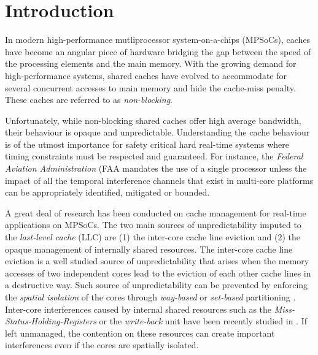 \section{Introduction}
    In modern high-performance mutliprocessor system-on-a-chips (MPSoCs), caches have become an angular piece of hardware bridging the gap between the speed of the processing elements and the main memory.
    With the growing demand for high-performance systems, shared caches have evolved to accommodate for several concurrent accesses to main memory and hide the cache-miss penalty.
    These caches are referred to as \emph{non-blocking}.

    Unfortunately, while non-blocking shared caches offer high average bandwidth, their behaviour is opaque and unpredictable.
    Understanding the cache behaviour is of the utmost importance for safety critical hard real-time systems where timing constraints must be respected and guaranteed.
    For instance, the \emph{Federal Aviation Administration} (FAA mandates the use of a single processor unless the impact of all the temporal interference channels that exist in multi-core platforms can be appropriately identified, mitigated or bounded.

    A great deal of research has been conducted on cache management for real-time applications on MPSoCs.
    The two main sources of unpredictability imputed to the \emph{last-level cache} (LLC) are (1) the inter-core cache line eviction and (2) the opaque management of internally shared resources.
    The inter-core cache line eviction is a well studied source of unpredictability that arises when the memory accesses of two independent cores lead to the eviction of each other cache lines in a destructive way.
    Such source of unpredictability can be prevented by enforcing the \emph{spatial isolation} of the cores through \emph{way-based} or \emph{set-based} partitioning \cite{Mancuso2013RealtimeCM, 6755286, Giovani_cahe_partitioning_survey}.
    Inter-core interferences caused by internal shared resources such as the \emph{Miss-Status-Holding-Registers} or the \emph{write-back} unit have been recently studied in \cite{Valsan2017AddressingIC, Heechul_DDOS_attacks_on_shared_cache}.
    If left unmanaged, the contention on these resources can create important interferences even if the cores are spatially isolated.\\

